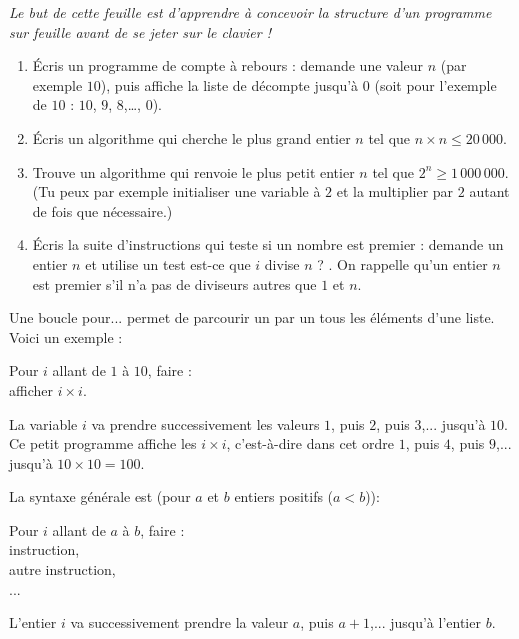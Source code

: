 \documentclass[class=report,crop=false, 12pt]{standalone}
\begin{document}

\emph{Le but de cette feuille est d'apprendre à concevoir la structure d'un programme sur feuille avant de se jeter sur le clavier !}

\bigskip
\bigskip

\begin{activite}
\sauteligne
\begin{enumerate} 
  \item Écris un programme de compte à rebours : demande une valeur $n$ (par exemple $10$), puis affiche la liste
  de décompte jusqu'à $0$ (soit pour l'exemple de $10$ : $10$, $9$, $8$,\ldots, $0$).
  
  \item Écris un algorithme qui cherche le plus grand entier $n$ tel que $n \times n \le  20\,000$.
 
  \item Trouve un algorithme qui renvoie le plus petit entier $n$ tel que $2^n \ge 1\,000\,000$. (Tu peux par exemple initialiser une variable à $2$ et la multiplier par $2$ autant de fois que nécessaire.)
  
  \item Écris la suite d'instructions qui teste si un nombre est premier : demande un entier $n$ et utilise un test \og est-ce que $i$ divise $n$ ? \fg{}.
  On rappelle qu'un entier $n$ est premier s'il n'a pas de diviseurs autres que $1$ et $n$.
  
\end{enumerate}

\end{activite}


\bigskip


Une boucle \og{}pour...\fg{} permet de parcourir un par un tous les éléments d'une liste.
Voici un exemple :
\begin{center}
\begin{minipage}{0.4\textwidth}
Pour $i$ allant de $1$ à $10$, faire :\\
\indentation afficher $i \times i$.
\end{minipage}
\end{center}
La variable $i$ va prendre successivement les valeurs $1$, puis $2$, puis $3$,... jusqu'à $10$.
Ce petit programme affiche les $i\times i$, c'est-à-dire dans cet ordre $1$, puis $4$, puis $9$,... jusqu'à $10 \times 10 = 100$. 


La syntaxe générale est (pour $a$ et $b$ entiers positifs ($a<b$)):
\begin{center}
\begin{minipage}{0.4\textwidth}
Pour $i$ allant de $a$ à $b$, faire :\\
\indentation instruction,\\
\indentation autre instruction,\\
\indentation ...\\
\end{minipage}
\end{center}
L'entier $i$ va successivement prendre la valeur $a$, puis $a+1$,... jusqu'à l'entier $b$.
\end{document}
